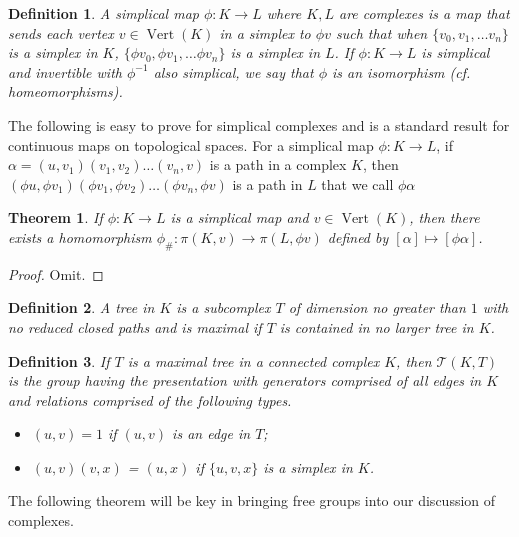 \documentclass[12pt]{article}
\newtheorem{definition}{Definition}
\newtheorem{theorem}{Theorem}
\theoremstyle{definition}
\numberwithin{equation}{theorem}
\begin{document}
\begin{definition}
  A simplical map $\phi:K \rightarrow L$ where $K,L$ are complexes is a map that sends each vertex $v \in \operatorname{Vert}(K)$ in a simplex to $\phi v$ such that when $\{ v_0, v_1, \dots v_n \}$ is a simplex in $K$, $\{\phi v_0, \phi v_1, \dots \phi v_n\}$ is a simplex in $L$. If $\phi:K \rightarrow L$ is simplical and invertible with $\phi^{-1}$ also simplical, we say that $\phi$ is an isomorphism (cf. homeomorphisms).
\end{definition}

The following is easy to prove for simplical complexes and is a standard result for continuous maps on topological spaces. For a simplical map $\phi:K \rightarrow L$, if $\alpha = (u,v_1)(v_1,v_2) \dots (v_n,v)$ is a path in a complex $K$, then $(\phi u,\phi v_1)(\phi v_1,\phi v_2) \dots (\phi v_n,\phi v)$ is a path in $L$ that we call $\phi \alpha$

\begin{theorem}
  If $\phi:K \rightarrow L$ is a simplical map and $v \in \operatorname{Vert}(K)$, then there exists a homomorphism $\phi_{\#}:\pi(K,v) \rightarrow \pi(L,\phi v)$ defined by $[\alpha] \mapsto [\phi \alpha]$.
\end{theorem}

\begin{proof}
Omit.  
\end{proof}

\begin{definition}
  A \emph{tree} in $K$ is a subcomplex $T$ of dimension no greater than $1$ with no reduced closed paths and is \emph{maximal} if $T$ is contained in no larger tree in $K$.
\end{definition}

\begin{definition}
  If $T$ is a maximal tree in a connected complex $K$, then $\mathcal{T}(K,T)$ is the group having the presentation with generators comprised of all edges in $K$ and relations comprised of the following types.
  \begin{itemize}
  \item $(u,v) = 1$ if $(u,v)$ is an edge in $T$;
  \item $(u,v)(v,x)$ = $(u,x)$ if $\{u,v,x \}$ is a simplex in $K$.
  \end{itemize}
\end{definition}

The following theorem will be key in bringing free groups into our discussion of complexes.
\end{document}
